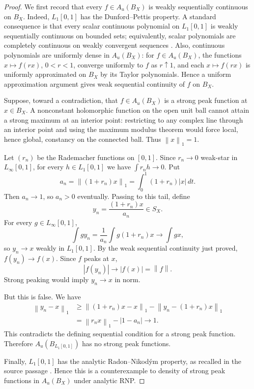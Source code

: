 \documentclass[11pt]{article}
\newcommand{\norm}[1]{\left\|#1\right\|}
\begin{document}
\begin{proof}
We first record that every \(f\in A_u(B_X)\) is weakly sequentially continuous
on \(B_X\). Indeed, \(L_1[0,1]\) has the Dunford--Pettis property. A standard
consequence is that every scalar continuous polynomial on \(L_1[0,1]\) is
weakly sequentially continuous on bounded sets; equivalently, scalar
polynomials are completely continuous on weakly convergent sequences
\cite{farmer-johnson}. Also, continuous polynomials are uniformly dense in
\(A_u(B_X)\): for \(f\in A_u(B_X)\), the functions \(x\mapsto f(rx)\),
\(0<r<1\), converge uniformly to \(f\) as \(r\uparrow 1\), and each
\(x\mapsto f(rx)\) is uniformly approximated on \(B_X\) by its Taylor
polynomials. Hence a uniform approximation argument gives weak sequential
continuity of \(f\) on \(B_X\).

Suppose, toward a contradiction, that \(f\in A_u(B_X)\) is a strong peak
function at \(x\in B_X\). A nonconstant holomorphic function on the open unit
ball cannot attain a strong maximum at an interior point: restricting to any
complex line through an interior point and using the maximum modulus theorem
would force local, hence global, constancy on the connected ball. Thus
\(\norm{x}_1=1\).

Let \((r_n)\) be the Rademacher functions on \([0,1]\). Since \(r_n\to 0\)
weak-star in \(L_\infty[0,1]\), for every \(h\in L_1[0,1]\) we have
\(\int r_n h\to0\). Put
\[
  a_n=\norm{(1+r_n)x}_1=\int_0^1(1+r_n)|x|\,dt.
\]
Then \(a_n\to1\), so \(a_n>0\) eventually. Passing to this tail, define
\[
  y_n=\frac{(1+r_n)x}{a_n}\in S_X.
\]
For every \(g\in L_\infty[0,1]\),
\[
  \int g y_n
  =\frac{1}{a_n}\int g(1+r_n)x
  \longrightarrow \int gx,
\]
so \(y_n\to x\) weakly in \(L_1[0,1]\). By the weak sequential continuity just
proved, \(f(y_n)\to f(x)\). Since \(f\) peaks at \(x\),
\[
  |f(y_n)|\longrightarrow |f(x)|=\norm{f}.
\]
Strong peaking would imply \(y_n\to x\) in norm.

But this is false. We have
\[
\begin{aligned}
 \norm{y_n-x}_1
 &\ge \norm{(1+r_n)x-x}_1-\norm{y_n-(1+r_n)x}_1\\
 &=\norm{r_nx}_1-|1-a_n|
 \longrightarrow 1.
\end{aligned}
\]
This contradicts the defining sequential condition for a strong peak
function. Therefore \(A_u(B_{L_1[0,1]})\) has no strong peak functions.

Finally, \(L_1[0,1]\) has the analytic Radon--Nikod\'ym property, as recalled
in the source passage \cite[p.~16]{choi-lee-song}. Hence this is a
counterexample to density of strong peak functions in \(A_u(B_X)\) under
analytic RNP.
\end{proof}
\end{document}

